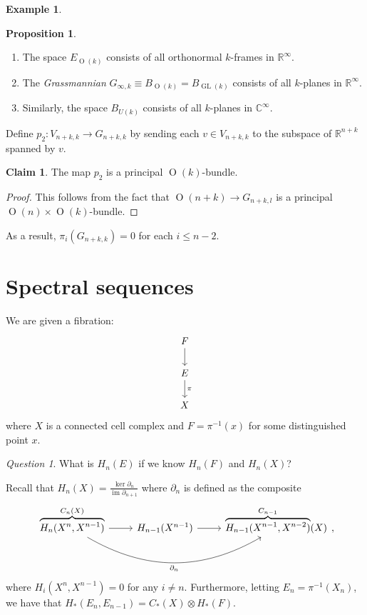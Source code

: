 \documentclass[10pt,letterpaper,cm]{nupset}
\theoremstyle{definition}
\newtheorem{exmp}[defn]{Example}
\theoremstyle{theorem}
\newtheorem{prop}[defn]{Proposition}
\newtheorem*{claim}{Claim}
\theoremstyle{remark}
\newtheorem*{question}{Question}
\newcommand{\C}{\mathbb C}
\newcommand{\R}{\mathbb{R}}
\newcommand{\1}{\mathbb{1}}
\newcommand{\0}{\vec 0}
\DeclareMathOperator{\im}{im}
\DeclareMathOperator{\GL}{GL}
\DeclareMathOperator{\Or}{O}
\newcommand{\be}{\begin{enumerate}}
\newcommand{\ee}{\end{enumerate}}
\begin{document}
\begin{exmp}
\begin{prop} $ $
\be
\item  The space $E_{\Or(k)}$ consists of all orthonormal $k$-frames in $\R^{\infty}$. 
\item The \textit{Grassmannian}  $G_{\infty, k} \equiv B_{\Or(k)} = B_{\GL(k)}$ consists of all $k$-planes in $\R^{\infty}$. 
\item Similarly, the space $B_{U(k)}$ consists of all $k$-planes in $\C^{\infty}$.
\ee
\end{prop}

\smallskip

Define $p_2: V_{n+k, k} \to G_{n+k, k}$ by sending each $v \in V_{n+k, k}$ to the subspace of $\R^{n+k}$ spanned by $v$. 
\begin{claim}
The map $p_2$ is a principal $\Or(k)$-bundle.
\end{claim}
\begin{proof}
This follows from the fact that $\Or(n + k) \to G_{n+k, l}$ is a principal $\Or(n) \times \Or(k)$-bundle.
\end{proof}

As a result, $\pi_i(G_{n+k, k}) =0$ for each $i\leq n-2$.
\end{exmp}

\section{Spectral sequences}

We are given a  fibration:
\[
\begin{tikzcd}
F \arrow[d]        \\
E \arrow[d, "\pi"] \\
X                 
\end{tikzcd}
\]
where $X$ is a connected cell complex and $F= \pi^{-1}(x)$ for some distinguished point $x$. 

\begin{question}
What is $H_n(E)$ if we know $H_n(F)$ and $H_n(X)$?
\end{question}

Recall that $H_n(X) = \frac{\ker{\partial_n}}{\im{\partial_{n+1}}}$ where $\partial_n$ is defined as the composite
\[
\begin{tikzcd}
{\overbrace{H_n(X^n, X^{n-1})}^{C_n(X)}} \arrow[r] \arrow[rr, "\partial_n"', bend right] & H_{n-1}(X^{n-1}) \arrow[r] & {\overbrace{H_{n-1}(X^{n-1}, X^{n-2})}^{C_{n-1}}(X)}
\end{tikzcd},
\]
where $H_i(X^n, X^{n-1})=0$ for any $i\ne n$. Furthermore, letting $E_n = \pi^{-1}(X_n)$, we have that $H_{\ast}(E_n, E_{n-1}) = C_{\ast}(X) \otimes H_{\ast}(F)$.
\end{document}
